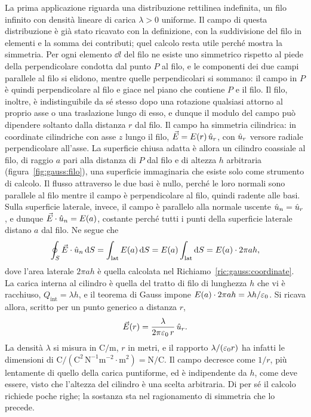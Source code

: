 \documentclass[11pt,a4paper]{article}
\begin{document}
La prima applicazione riguarda una distribuzione rettilinea indefinita, un filo infinito con densità lineare di carica $\lambda>0$ uniforme. Il campo di questa distribuzione è già stato ricavato con la definizione, con la suddivisione del filo in elementi e la somma dei contributi; quel calcolo resta utile perché mostra la simmetria. Per ogni elemento $\dd l$ del filo ne esiste uno simmetrico rispetto al piede della perpendicolare condotta dal punto $P$ al filo, e le componenti dei due campi parallele al filo si elidono, mentre quelle perpendicolari si sommano: il campo in $P$ è quindi perpendicolare al filo e giace nel piano che contiene $P$ e il filo. Il filo, inoltre, è indistinguibile da sé stesso dopo una rotazione qualsiasi attorno al proprio asse o una traslazione lungo di esso, e dunque il modulo del campo può dipendere soltanto dalla distanza $r$ dal filo. Il campo ha simmetria cilindrica: in coordinate cilindriche con asse $z$ lungo il filo, $\vec{E}=E(r)\,\hat{u}_r$, con $\hat{u}_r$ versore radiale perpendicolare all'asse. La superficie chiusa adatta è allora un cilindro coassiale al filo, di raggio $a$ pari alla distanza di $P$ dal filo e di altezza $h$ arbitraria (figura~\ref{fig:gauss:filo}), una superficie immaginaria che esiste solo come strumento di calcolo. Il flusso attraverso le due basi è nullo, perché le loro normali sono parallele al filo mentre il campo è perpendicolare al filo, quindi radente alle basi. Sulla superficie laterale, invece, il campo è parallelo alla normale uscente $\hat{u}_n=\hat{u}_r$, e dunque $\vec{E}\cdot\hat{u}_n=E(a)$, costante perché tutti i punti della superficie laterale distano $a$ dal filo. Ne segue che
\[
\oint_S\vec{E}\cdot\hat{u}_n\,\mathrm{d} S=\int_{\mathrm{lat}}E(a)\,\mathrm{d} S=E(a)\int_{\mathrm{lat}}\mathrm{d} S=E(a)\cdot2\pi a h ,
\]
dove l'area laterale $2\pi a h$ è quella calcolata nel Richiamo~\ref{ric:gauss:coordinate}. La carica interna al cilindro è quella del tratto di filo di lunghezza $h$ che vi è racchiuso, $Q_{\mathrm{int}}=\lambda h$, e il teorema di Gauss impone $E(a)\cdot2\pi a h=\lambda h/\varepsilon_0$. Si ricava allora, scritto per un punto generico a distanza $r$,
\begin{equation}
\vec{E}(r)=\frac{\lambda}{2\pi\varepsilon_0\,r}\,\hat{u}_r .
\label{eq:gauss:filo}
\end{equation}
La densità $\lambda$ si misura in $\mathrm{C/m}$, $r$ in metri, e il rapporto $\lambda/(\varepsilon_0 r)$ ha infatti le dimensioni di $\mathrm{C}/(\mathrm{C^2\,N^{-1}m^{-2}}\cdot\mathrm{m^2})=\mathrm{N/C}$. Il campo decresce come $1/r$, più lentamente di quello della carica puntiforme, ed è indipendente da $h$, come deve essere, visto che l'altezza del cilindro è una scelta arbitraria. Di per sé il calcolo richiede poche righe; la sostanza sta nel ragionamento di simmetria che lo precede.
\end{document}
